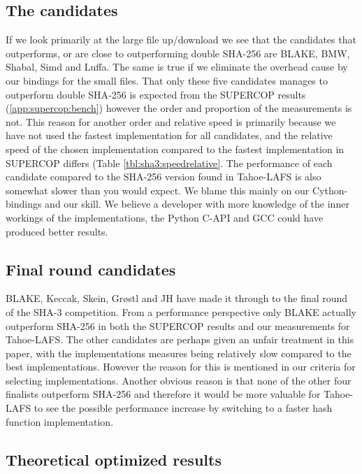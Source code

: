 \documentclass[english,12pt,a4paper]{book}
\begin{document}
\subsection{The candidates}

If we look primarily at the large file up/download we see that the candidates
that outperforms, or are close to outperforming double \ac{SHA}-256 are BLAKE,
\ac{BMW}, Shabal, Simd and Luffa. The same is true if we eliminate the overhead
cause by our bindings for the small files. That only these five candidates
manages to outperform double \ac{SHA}-256 is expected from the \ac{SUPERCOP}
results (\autoref{app:supercop:bench}) however the order and proportion of the
measurements is not. This reason for another order and relative speed is
primarily because we have not used the fastest implementation for all
candidates, and the relative speed of the chosen implementation compared to the
fastest implementation in \ac{SUPERCOP} differs (Table
\ref{tbl:sha3:speedrelative}.  The performance of each candidate compared to
the \ac{SHA}-256 version found in Tahoe-\ac{LAFS} is also somewhat slower than
you would expect. We blame this mainly on our Cython-bindings and our skill. We
believe a developer with more knowledge of the inner workings of the
implementations, the Python C-\ac{API} and \ac{GCC} could have produced better
results.

\subsection{Final round candidates}
BLAKE, Keccak, Skein, Grøstl and JH have made it through to the final round of
the \ac{SHA}-3 competition. From a performance perspective only BLAKE actually
outperform \ac{SHA}-256 in both the \ac{SUPERCOP} results and our measurements
for Tahoe-\ac{LAFS}. The other candidates are perhaps given an unfair treatment
in this paper, with the implementations measures being relatively slow compared
to the best implementations. However the reason for this is mentioned in our
criteria for selecting implementations. Another obvious reason is that none of
the other four finalists outperform \ac{SHA}-256 and therefore it would be more
valuable for Tahoe-\ac{LAFS} to see the possible performance increase by
switching to a faster hash function implementation.

\subsection{Theoretical optimized results}
\end{document}
